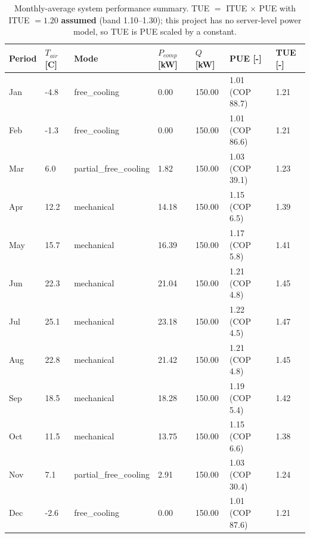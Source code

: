 \begin{table}[h!]
\caption{Monthly-average system performance summary. TUE $=$ ITUE $\times$ PUE with ITUE $= 1.20$ \textbf{assumed} (band 1.10--1.30); this project has no server-level power model, so TUE is PUE scaled by a constant.}
\label{tab:monthly_summary}
\begin{tabularx}{\linewidth}{lLLLLLL}
\toprule
\textbf{Period} & \textbf{$T_{air}$ [C]} & \textbf{Mode} & \textbf{$P_{comp}$ [kW]} & \textbf{$Q$ [kW]} & \textbf{PUE [-]} & \textbf{TUE [-]} \\
\midrule
Jan & -4.8 & free\_cooling & 0.00 & 150.00 & 1.01 (COP 88.7) & 1.21 \\
Feb & -1.3 & free\_cooling & 0.00 & 150.00 & 1.01 (COP 86.6) & 1.21 \\
Mar & 6.0 & partial\_free\_cooling & 1.82 & 150.00 & 1.03 (COP 39.1) & 1.23 \\
Apr & 12.2 & mechanical & 14.18 & 150.00 & 1.15 (COP 6.5) & 1.39 \\
May & 15.7 & mechanical & 16.39 & 150.00 & 1.17 (COP 5.8) & 1.41 \\
Jun & 22.3 & mechanical & 21.04 & 150.00 & 1.21 (COP 4.8) & 1.45 \\
Jul & 25.1 & mechanical & 23.18 & 150.00 & 1.22 (COP 4.5) & 1.47 \\
Aug & 22.8 & mechanical & 21.42 & 150.00 & 1.21 (COP 4.8) & 1.45 \\
Sep & 18.5 & mechanical & 18.28 & 150.00 & 1.19 (COP 5.4) & 1.42 \\
Oct & 11.5 & mechanical & 13.75 & 150.00 & 1.15 (COP 6.6) & 1.38 \\
Nov & 7.1 & partial\_free\_cooling & 2.91 & 150.00 & 1.03 (COP 30.4) & 1.24 \\
Dec & -2.6 & free\_cooling & 0.00 & 150.00 & 1.01 (COP 87.6) & 1.21 \\
\bottomrule
\end{tabularx}
\end{table}

